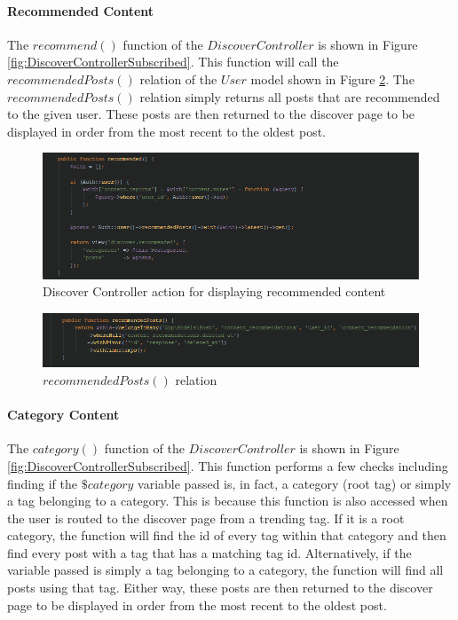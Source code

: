 \paragraph{Recommended Content}
The $recommend()$ function of the $Discover  Controller$ is shown in Figure \ref{fig:DiscoverControllerSubscribed}. This function will call the $recommendedPosts()$ relation of the $User$ model shown in Figure \ref{fig:RecommendedPosts}. The $recommendedPosts()$ relation simply returns all posts that are recommended to the given user. These posts are then returned to the discover page to be displayed in order from the most recent to the oldest post.

\begin{figure}[H]
\centering
\includegraphics[width=\textwidth]{Images/Implementation/DiscoverControllerRecommended}
\caption{Discover Controller action for displaying recommended content }
\label{fig:DiscoverControllerRecommended}
\end{figure}

\begin{figure}[H]
\centering
\includegraphics[width=\textwidth]{Images/Implementation/RecommendedPosts}
\caption{$recommendedPosts()$ relation}
\label{fig:RecommendedPosts}
\end{figure}

\paragraph{Category Content}
The $category()$ function of the $Discover  Controller$ is shown in Figure \ref{fig:DiscoverControllerSubscribed}. This function performs a few checks including finding if the $\$category$ variable passed is, in fact, a category (root tag) or simply a tag belonging to a category. This is because this function is also accessed when the user is routed to the discover page from a trending tag. If it is a root category, the function will find the id of every tag within that category and then find every post with a tag that has a matching tag id. Alternatively, if the variable passed is simply a tag belonging to a category, the function will find all posts using that tag. Either way, these posts are then returned to the discover page to be displayed in order from the most recent to the oldest post.

